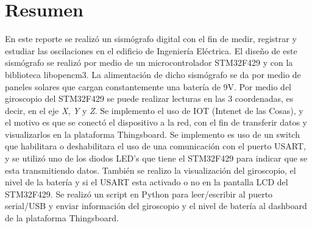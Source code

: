 \section{Resumen}

En este reporte se realizó un sismógrafo digital con el fin de medir, registrar y estudiar las oscilaciones en el edificio de Ingeniería Eléctrica. El diseño de este sismógrafo se realizó por medio de un microcontrolador STM32F429 y con la biblioteca libopencm3. La alimentación de dicho sismógrafo se da por medio de paneles solares que cargan constantemente una batería de 9V. Por medio del giroscopio del STM32F429 se puede realizar lecturas en las 3 coordenadas, es decir, en el eje \textit{X}, \textit{Y} y \textit{Z}. Se implemento el uso de IOT (Intenet de las Cosas), y el motivo es que se conectó el dispositivo a la red, con el fin de transferir datos y visualizarlos en la plataforma Thingsboard. Se implemento es uso de un switch que habilitara o deshabilitara el uso de una comunicación con el puerto USART, y se utilizó uno de los diodos LED's que tiene el STM32F429 para indicar que se esta transmitiendo datos. También se realizo la visualización del giroscopio, el nivel de la batería y si el USART esta activado o no en la pantalla LCD del STM32F429. Se realizó un script en Python para leer/escribir al puerto serial/USB y enviar información del giroscopio y el nivel de batería al dashboard de la plataforma Thingsboard.

